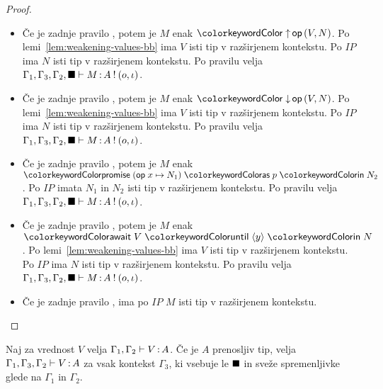 \begin{proof}
\begin{itemize}
		\item Če je zadnje pravilo , potem je $M$ enak $\tmopout{op}{V}{N}$.
		Po lemi~\ref{lem:weakening-values-bb} ima $V$ isti tip v razširjenem kontekstu.
		Po $IP$ ima $N$ isti tip v razširjenem kontekstu.
		Po pravilu  velja $\Gamma_1, \Gamma_3, \Gamma_2, \blacksquare \vdash M \mathinner{:} A \mathbin{!} (o, \iota)$.
		
		\item Če je zadnje pravilo , potem je $M$ enak $\tmopin{op}{V}{N}$.
		Po lemi~\ref{lem:weakening-values-bb} ima $V$ isti tip v razširjenem kontekstu.
		Po $IP$ ima $N$ isti tip v razširjenem kontekstu.
		Po pravilu  velja $\Gamma_1, \Gamma_3, \Gamma_2, \blacksquare \vdash M \mathinner{:} A \mathbin{!} (o, \iota)$.
		
		\item Če je zadnje pravilo , potem je $M$ enak $\tmwith{op}{x}{N_1}{p}{N_2}$.
		Po $IP$ imata $N_1$ in $N_2$ isti tip v razširjenem kontekstu.
		Po pravilu  velja $\Gamma_1, \Gamma_3, \Gamma_2, \blacksquare \vdash M \mathinner{:} A \mathbin{!} (o, \iota)$.
		
		\item Če je zadnje pravilo , potem je $M$ enak $\tmawait{V}{y}{N}$.
		Po lemi~\ref{lem:weakening-values-bb} ima $V$ isti tip v razširjenem kontekstu.
		Po $IP$ ima $N$ isti tip v razširjenem kontekstu.
		Po pravilu  velja $\Gamma_1, \Gamma_3, \Gamma_2, \blacksquare \vdash M \mathinner{:} A \mathbin{!} (o, \iota)$.
		
		\item Če je zadnje pravilo , ima po $IP$ $M$ isti tip v razširjenem kontekstu.
		
	\end{itemize}
\end{proof}


\begin{lema}\label{lem:weakening-values-prenosljiv}
	Naj za vrednost $V$ velja $\Gamma_1, \Gamma_2 \vdash V \mathinner{:} A$. Če je $A$ prenosljiv tip, velja $\Gamma_1, \Gamma_3, \Gamma_2 \vdash V \mathinner{:} A$ za vsak kontekst $\Gamma_3$, ki vsebuje le $\blacksquare$ in sveže spremenljivke glede na $\Gamma_1$ in $\Gamma_2$.
\end{lema}

